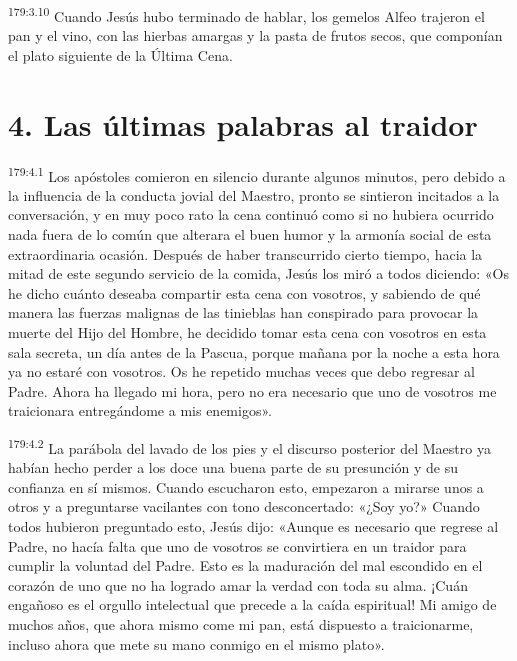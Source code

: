 \par 
\textsuperscript{179:3.10} Cuando Jesús hubo terminado de hablar, los gemelos Alfeo trajeron el pan y el vino, con las hierbas amargas y la pasta de frutos secos, que componían el plato siguiente de la
Última Cena.

\section*{4. Las últimas palabras al traidor}
\par 
\textsuperscript{179:4.1} Los apóstoles comieron en silencio durante algunos minutos, pero debido a la influencia de la conducta jovial del Maestro, pronto se sintieron incitados a la conversación, y en muy poco rato la cena continuó como si no hubiera ocurrido nada fuera de lo común que alterara el buen humor y la armonía social de esta extraordinaria ocasión. Después de haber transcurrido cierto tiempo, hacia la mitad de este segundo servicio de la comida, Jesús los miró a todos diciendo: «Os he dicho cuánto deseaba compartir esta cena con vosotros, y sabiendo de qué manera las fuerzas malignas de las tinieblas han conspirado para provocar la muerte del Hijo del Hombre, he decidido tomar esta cena con vosotros en esta sala secreta, un día antes de la Pascua, porque mañana por la noche a esta hora ya no estaré con vosotros. Os he repetido muchas veces que debo regresar al Padre. Ahora ha llegado mi hora, pero no era necesario que uno de vosotros me traicionara entregándome a mis enemigos».

\par 
\textsuperscript{179:4.2} La parábola del lavado de los pies y el discurso posterior del Maestro ya habían hecho perder a los doce una buena parte de su presunción y de su confianza en sí mismos. Cuando escucharon esto, empezaron a mirarse unos a otros y a preguntarse vacilantes con tono desconcertado: «¿Soy yo?» Cuando todos hubieron preguntado esto, Jesús dijo: «Aunque es necesario que regrese al Padre, no hacía falta que uno de vosotros se convirtiera en un traidor para cumplir la voluntad del Padre. Esto es la maduración del mal escondido en el corazón de uno que no ha logrado amar la verdad con toda su alma. ¡Cuán engañoso es el orgullo intelectual que precede a la caída espiritual! Mi amigo de muchos años, que ahora mismo come mi pan, está dispuesto a traicionarme, incluso ahora que mete su mano conmigo en el mismo plato».

